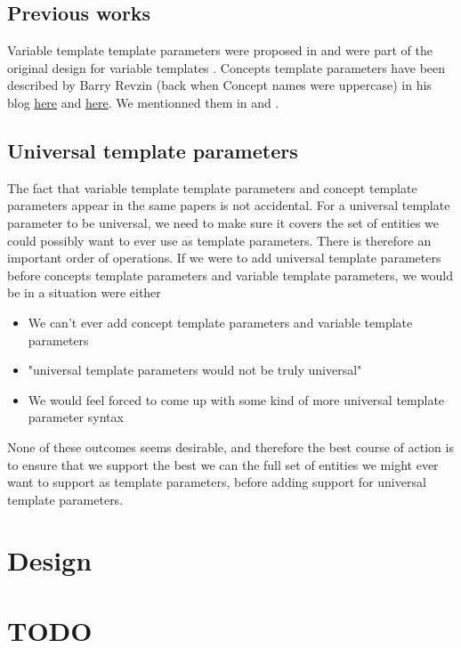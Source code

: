 \documentclass{wg21}
\begin{document}
\subsection{Previous works}

Variable template template parameters were proposed in  and were part of the original design for variable templates .
Concepts template parameters have been described by Barry Revzin (back when Concept names were uppercase) in his blog \href{https://brevzin.github.io/c++/2019/01/09/concept-templates/}{here} and \href{https://brevzin.github.io/c++/2019/03/24/concept-templates-2/}{here}.
We mentionned them in  and .

\subsection{Universal template parameters}

The fact that variable template template parameters and concept template parameters appear in the same papers is not accidental.
For a universal template parameter to be universal, we need to make sure it covers the set of entities we could possibly want to ever use as template parameters.
There is therefore an important order of operations.
If we were to add universal template parameters before concepts template parameters and variable template parameters, we would be in a situation were either
\begin{itemize}
\item We can't ever add concept template parameters and variable template parameters
\item "universal template parameters would not be truly universal"
\item We would feel forced to come up with some kind of more universal template parameter syntax
\end{itemize}

None of these outcomes seems desirable, and therefore the best course of action is to ensure that we
support the best we can the full set of entities we might ever want to support as template parameters, before adding support for universal template parameters.

\section{Design}

\section{TODO}
\end{document}
